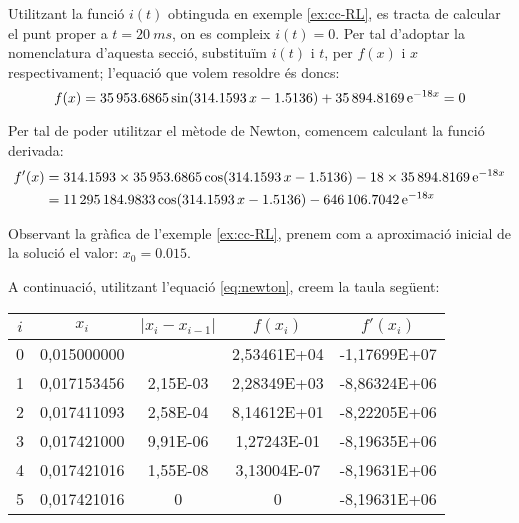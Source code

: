 \begin{exemple}
    Utilitzant la funció $i(t)$ obtinguda en exemple \vref{ex:cc-RL}, es tracta de calcular el punt proper a $t = \qty{20}{ms}$, on es compleix $i(t)=0$. Per tal d'adoptar la nomenclatura d'aquesta secció, substituïm $i(t)$ i $t$, per $f(x)$ i $x$ respectivament; l'equació que volem resoldre és doncs:
    \[
        f(x) = \num{35953,6865}\sin(\num{314,1593}\,x-\num{1,5136}) + \num{35894,8169}\,\mathrm{e}^{-18 x} = 0
    \]

    Per tal de poder utilitzar el mètode de Newton, comencem calculant la funció derivada:
    \begin{align*}
        f'(x) &= \num{314,1593}\times\num{35953,6865}\cos(\num{314,1593}\,x-\num{1,5136}) -18\times \num{35894,8169}\,\mathrm{e}^{-18 x} \\
        {} &= \num{11295184,9833}\cos(\num{314,1593}\,x-\num{1,5136}) - \num{646106,7042}\,\mathrm{e}^{-18 x}
    \end{align*}

    Observant la gràfica de l'exemple \vref{ex:cc-RL}, prenem com a  aproximació inicial de la solució el valor: $x_0 = \num{0,015}$.

    A continuació, utilitzant l'equació \eqref{eq:newton}, creem la taula següent:

\begin{center}
   \centering
   \begin{tabular}{S[table-format=1.0]S[table-format=2.9]S[table-format=2.2e+2]
   S[table-format=2.5e+2]S[table-format=+3.5e+2]}
    & {$x_i$}  & {$|x_i - x_{i-1}|$} & {$f(x_i)$} & {$f'(x_i)$} \\
    &	0,015000000 &	{}       & 2,53461E+04	& -1,17699E+07 \\
        1 &	0,017153456 &	2,15E-03 & 2,28349E+03	& -8,86324E+06 \\	
        2 &	0,017411093 &	2,58E-04 & 8,14612E+01	& -8,22205E+06 \\	
        3 &	0,017421000 &	9,91E-06 & 1,27243E-01	& -8,19635E+06 \\	
        4 &	0,017421016 &	1,55E-08 & 3,13004E-07	& -8,19631E+06 \\	
        5 &	0,017421016 &	0        & 0           	& -8,19631E+06 \\	
   \bottomrule[1pt]
   \end{tabular}
\end{center}


\end{exemple}
